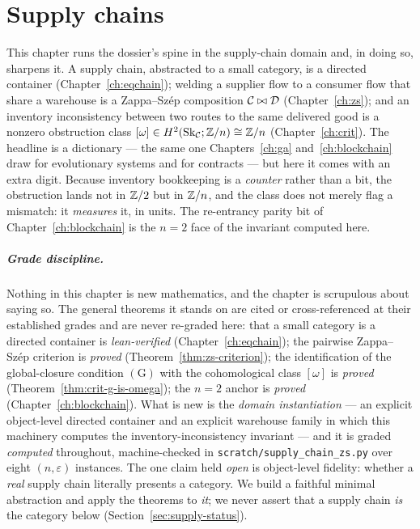 \chapter{Supply chains}
\label{ch:supply}

This chapter runs the dossier's spine in the supply-chain domain and, in doing
so, sharpens it. A supply chain, abstracted to a small category, is a directed
container (Chapter~\ref{ch:eqchain}); welding a supplier flow to a consumer flow
that share a warehouse is a Zappa--Sz\'ep composition $\mathcal{C}\bowtie\mathcal{D}$
(Chapter~\ref{ch:zs}); and an inventory inconsistency between two routes to the
same delivered good is a nonzero obstruction class
$[\omega]\in H^2(\mathrm{Sk}_{\mathcal{C}};\mathbb{Z}/n)\cong\mathbb{Z}/n$ (Chapter~\ref{ch:crit}). The
headline is a dictionary --- the same one Chapters~\ref{ch:ga}
and~\ref{ch:blockchain} draw for evolutionary systems and for contracts --- but
here it comes with an extra digit. Because inventory bookkeeping is a
\emph{counter} rather than a bit, the obstruction lands not in $\mathbb{Z}/2$ but in
$\mathbb{Z}/n$, and the class does not merely flag a mismatch: it \emph{measures} it, in
units. The re-entrancy parity bit of Chapter~\ref{ch:blockchain} is the $n=2$
face of the invariant computed here.

\paragraph{Grade discipline.} Nothing in this chapter is new mathematics, and
the chapter is scrupulous about saying so. The general theorems it stands on are
cited or cross-referenced at their established grades and are never re-graded
here: that a small category is a directed container is \emph{lean-verified}
(Chapter~\ref{ch:eqchain}); the pairwise Zappa--Sz\'ep criterion is \emph{proved}
(Theorem~\ref{thm:zs-criterion}); the identification of the global-closure
condition $(\mathrm{G})$ with the cohomological class $[\omega]$ is \emph{proved}
(Theorem~\ref{thm:crit-g-is-omega}); the $n=2$ anchor is \emph{proved}
(Chapter~\ref{ch:blockchain}). What is new is the \emph{domain instantiation} ---
an explicit object-level directed container and an explicit warehouse family in
which this machinery computes the inventory-inconsistency invariant --- and it is
graded \emph{computed} throughout, machine-checked in
\texttt{scratch/supply\_chain\_zs.py} over eight $(n,\varepsilon)$ instances. The
one claim held \emph{open} is object-level fidelity: whether a \emph{real} supply
chain literally presents a category. We build a faithful minimal abstraction and
apply the theorems to \emph{it}; we never assert that a supply chain \emph{is}
the category below (Section~\ref{sec:supply-status}).

